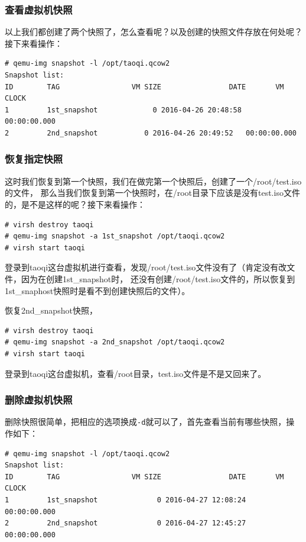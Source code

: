 \subsubsection{查看虚拟机快照}
\label{sec:listVmSnapShot}

以上我们都创建了两个快照了，怎么查看呢？以及创建的快照文件存放在何处呢？接下来看操作：

\begin{verbatim}
# qemu-img snapshot -l /opt/taoqi.qcow2 
Snapshot list:
ID        TAG                 VM SIZE                DATE       VM CLOCK
1         1st_snapshot             0 2016-04-26 20:48:58   00:00:00.000
2         2nd_snapshot           0 2016-04-26 20:49:52   00:00:00.000
\end{verbatim}

\subsubsection{恢复指定快照}
\label{sec:resumeSpecificVmSnapShost}

这时我们恢复到第一个快照，我们在做完第一个快照后，创建了一个/root/test.iso的文件，
那么当我们恢复到第一个快照时，在/root目录下应该是没有test.iso文件的，是不是这样的呢？接下来看操作：

\begin{verbatim}
# virsh destroy taoqi
# qemu-img snapshot -a 1st_snapshot /opt/taoqi.qcow2
# virsh start taoqi
\end{verbatim}

登录到taoqi这台虚拟机进行查看，发现/root/test.iso文件没有了（肯定没有改文件，因为在创建1st\_snapshot时，
还没有创建/root/test.iso文件的，所以恢复到1st\_snaphost快照时是看不到创建快照后的文件）。

恢复2nd\_snapshot快照，

\begin{verbatim}
# virsh destroy taoqi
# qemu-img snapshot -a 2nd_snapshot /opt/taoqi.qcow2
# virsh start taoqi
\end{verbatim}

登录到taoqi这台虚拟机，查看/root目录，test.iso文件是不是又回来了。

\subsubsection{删除虚拟机快照}
\label{sec:deleteVmSnapShot}

删除快照很简单，把相应的选项换成\verb|-d|就可以了，首先查看当前有哪些快照，操作如下：

\begin{verbatim}
# qemu-img snapshot -l /opt/taoqi.qcow2 
Snapshot list:
ID        TAG                 VM SIZE                DATE       VM CLOCK
1         1st_snapshot              0 2016-04-27 12:08:24   00:00:00.000
2         2nd_snapshot              0 2016-04-27 12:45:27   00:00:00.000
\end{verbatim}

